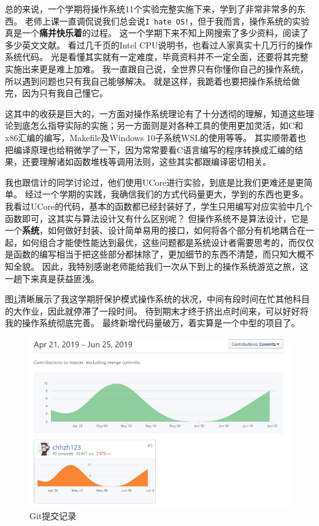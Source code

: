 \documentclass[logo,reportComp]{thesis}
\begin{document}
总的来说，一个学期将操作系统11个实验完整实施下来，学到了非常非常多的东西。
老师上课一直调侃说我们总会说\verb'I hate OS!'，但于我而言，操作系统的实验真是一个\textbf{痛并快乐着}的过程。
这一个学期下来不知上网搜索了多少资料，阅读了多少英文文献。
看过几千页的Intel CPU说明书，也看过人家真实十几万行的操作系统代码。
光是看懂其实就有一定难度，毕竟资料并不一定全面，还要将其完整实施出来更是难上加难。
我一直跟自己说，全世界只有你懂你自己的操作系统，所以遇到问题也只有我自己能够解决。
就是这样，我跪着也要把操作系统给做完，因为只有我自己懂它。

这其中的收获是巨大的，一方面对操作系统理论有了十分透彻的理解，知道这些理论到底怎么指导实际的实施；另一方面则是对各种工具的使用更加灵活，如C和x86汇编的编写，Makefile及Windows 10子系统WSL的使用等等。
其实顺带着也把编译原理也给稍微学了一下，因为常常要看C语言编写的程序转换成汇编的结果，还要理解诸如函数堆栈等调用法则，这些其实都跟编译密切相关。

我也跟信计的同学讨论过，他们使用UCore进行实验，到底是比我们更难还是更简单。
经过一个学期的实践，我确信我们的方式代码量更大，学到的东西也更多。
我看过UCore的代码，基本的函数都已经封装好了，学生只用编写对应实验中几个函数即可，这其实与算法设计又有什么区别呢？
但操作系统不是算法设计，它是一个\textbf{系统}，如何做好封装、设计简单易用的接口，如何将各个部分有机地耦合在一起，如何组合才能使性能达到最优，这些问题都是系统设计者需要思考的，而仅仅是函数的编写相当于把这些部分都抹除了，更加细节的东西不清楚，而只知大概不知全貌。
因此，我特别感谢老师能给我们一次从下到上的操作系统游览之旅，这一趟下来真是获益匪浅。

图\ref{fig:git}清晰展示了我这学期肝保护模式操作系统的状况，中间有段时间在忙其他科目的大作业，因此就停滞了一段时间。
待到期末才终于挤出点时间来，可以好好将我的操作系统彻底完善。
最终新增代码量破万，着实算是一个中型的项目了。
\begin{figure}[H]
\centering
\includegraphics[width=0.8\linewidth]{fig/github.png}
\caption{Git提交记录}
\label{fig:git}
\end{figure}
\end{document}
